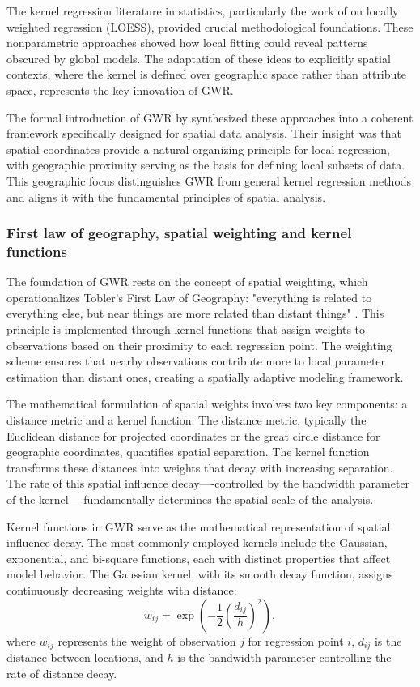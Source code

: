 \documentclass[smallextended, natbib]{svjour3}       %
\begin{document}
The kernel regression literature in statistics, particularly the work of \cite{cleveland1979robust} on locally weighted regression (LOESS), provided crucial methodological foundations. 
These nonparametric approaches showed how local fitting could reveal patterns obscured by global models. 
The adaptation of these ideas to explicitly spatial contexts, where the kernel is defined over geographic space rather than attribute space, represents the key innovation of GWR.

The formal introduction of GWR by \cite{Brunsdon1996} synthesized these approaches into a coherent framework specifically designed for spatial data analysis. 
Their insight was that spatial coordinates provide a natural organizing principle for local regression, with geographic proximity serving as the basis for defining local subsets of data. 
This geographic focus distinguishes GWR from general kernel regression methods and aligns it with the fundamental principles of spatial analysis.

\subsubsection*{First law of geography, spatial weighting and kernel functions}

The foundation of GWR rests on the concept of spatial weighting, which operationalizes Tobler's First Law of Geography: "everything is related to everything else, but near things are more related than distant things" \citep{tobler1970computer}. 
This principle is implemented through kernel functions that assign weights to observations based on their proximity to each regression point. 
The weighting scheme ensures that nearby observations contribute more to local parameter estimation than distant ones, creating a spatially adaptive modeling framework.

The mathematical formulation of spatial weights involves two key components: a distance metric and a kernel function. 
The distance metric, typically the Euclidean distance for projected coordinates or the great circle distance for geographic coordinates, quantifies spatial separation. 
The kernel function transforms these distances into weights that decay with increasing separation. 
The rate of this spatial influence decay----controlled by the bandwidth parameter of the kernel----fundamentally determines the spatial scale of the analysis.

Kernel functions in GWR serve as the mathematical representation of spatial influence decay. 
The most commonly employed kernels include the Gaussian, exponential, and bi-square functions, each with distinct properties that affect model behavior. 
The Gaussian kernel, with its smooth decay function, assigns continuously decreasing weights with distance:
$$w_{ij} = \exp\left(-\frac{1}{2}\left(\frac{d_{ij}}{h}\right)^2\right),$$
where $w_{ij}$ represents the weight of observation $j$ for regression point $i$, $d_{ij}$ is the distance between locations, and $h$ is the bandwidth parameter controlling the rate of distance decay.
\end{document}
